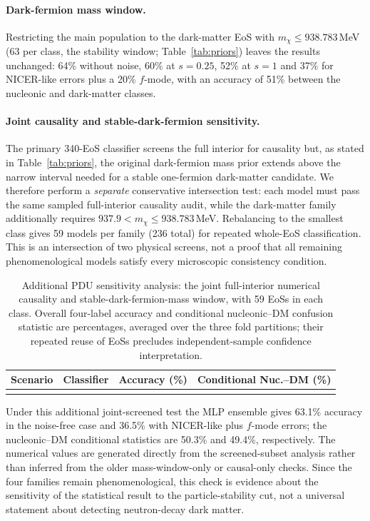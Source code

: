 \documentclass[11pt,a4paper]{article}
\begin{document}
\paragraph{Dark-fermion mass window.} Restricting the main population to the dark-matter EoS with $m_\chi\le938.783$\,MeV (63 per class, the stability window; Table~\ref{tab:priors}) leaves the results unchanged: 64\% without noise, 60\% at $s=0.25$, 52\% at $s=1$ and 37\% for NICER-like errors plus a 20\% $f$-mode, with an accuracy of 51\% between the nucleonic and dark-matter classes.

\paragraph{Joint causality and stable-dark-fermion sensitivity.}
The primary 340-EoS classifier screens the full interior for causality but, as stated in Table~\ref{tab:priors}, the original dark-fermion mass prior extends above the narrow interval needed for a stable one-fermion dark-matter candidate. We therefore perform a \emph{separate} conservative intersection test: each model must pass the same sampled full-interior causality audit, while the dark-matter family additionally requires $937.9<m_\chi\le 938.783$\,MeV. Rebalancing to the smallest class gives 59 models per family (236 total) for repeated whole-EoS classification. This is an intersection of two physical screens, not a proof that all remaining phenomenological models satisfy every microscopic consistency condition.

\begin{table}[t]\centering\small
\caption{Additional PDU sensitivity analysis: the joint full-interior numerical causality and stable-dark-fermion-mass window, with 59 EoSs in each class. Overall four-label accuracy and conditional nucleonic--DM confusion statistic are percentages, averaged over the three fold partitions; their repeated reuse of EoSs precludes independent-sample confidence interpretation.}\label{tab:jointstability}
\begin{tabular}{llrr}\toprule
Scenario & Classifier & Accuracy (\%) & Conditional Nuc.--DM (\%)\\\midrule
\\\bottomrule
\end{tabular}\end{table}
Under this additional joint-screened test the MLP ensemble gives 63.1\% accuracy in the noise-free case and 36.5\% with NICER-like plus $f$-mode errors; the nucleonic--DM conditional statistics are 50.3\% and 49.4\%, respectively. The numerical values are generated directly from the screened-subset analysis rather than inferred from the older mass-window-only or causal-only checks. Since the four families remain phenomenological, this check is evidence about the sensitivity of the statistical result to the particle-stability cut, not a universal statement about detecting neutron-decay dark matter.
\end{document}
